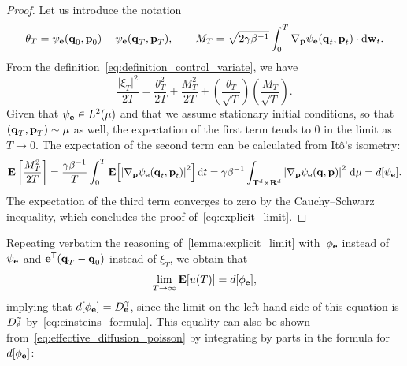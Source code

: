 \documentclass[11pt,a4paper]{article}
\begin{document}
\begin{proof}
    Let us introduce the notation
    \[
        \theta_T = \psi_{\boldsymbol{\mathbf e}}(\boldsymbol{\mathbf q}_0, \boldsymbol{\mathbf p}_0) - \psi_{\boldsymbol{\mathbf e}}(\boldsymbol{\mathbf q}_T, \boldsymbol{\mathbf p}_T),
        \qquad
        M_T = \sqrt{2 \gamma \beta^{-1}} \int_{0}^{T} \nabla_{\boldsymbol{\mathbf p}} \psi_{\boldsymbol{\mathbf e}}(\boldsymbol{\mathbf q}_t, \boldsymbol{\mathbf p}_t) \cdot \mathrm d \boldsymbol{\mathbf w}_t.
    \]
    From the definition~\eqref{eq:definition_control_variate},
    we have
    \[
        \frac{\lvert \xi_T \rvert^2}{2T} = \frac{\theta_T^2}{2T} + \frac{M_T^2}{2T} + \left(\frac{\theta_T}{\sqrt{T}}\right) \left(\frac{M_T}{\sqrt{T}}\right).
    \]
    Given that $\psi_{\boldsymbol{\mathbf e}} \in L^2(\mu)$ and that we assume stationary initial conditions,
    so that $(\boldsymbol{\mathbf q}_T, \boldsymbol{\mathbf p}_T) \sim \mu$ as well,
    the expectation of the first term tends to 0 in the limit as $T \to 0$.
    The expectation of the second term can be calculated from It\^o's isometry:
    \[
        \mathbf{E} \left[ \frac{M_T^2}{2T} \right]
        = \frac{\gamma \beta^{-1}}{T} \int_{0}^{T} \mathbf{E} \Bigl[\left\lvert \nabla_{\boldsymbol{\mathbf p}} \psi_{\boldsymbol{\mathbf e}}(\boldsymbol{\mathbf q}_t, \boldsymbol{\mathbf p}_t) \right\rvert^2\Bigr] \, \mathrm d t
        = \gamma \beta^{-1} \int_{\mathbf T^d \times \mathbf R^d} \left\lvert \nabla_{\boldsymbol{\mathbf p}} \psi_{\boldsymbol{\mathbf e}}(\boldsymbol{\mathbf q}, \boldsymbol{\mathbf p}) \right\rvert^2 \, \mathrm d \mu
        = d[\psi_{\boldsymbol{\mathbf e}}].
    \]
    The expectation of the third term converges to zero by the Cauchy--Schwarz inequality,
    which concludes the proof of~\eqref{eq:explicit_limit}.
\end{proof}
Repeating verbatim the reasoning of~\cref{lemma:explicit_limit} with~$\phi_{\boldsymbol{\mathbf e}}$ instead of $\psi_{\boldsymbol{\mathbf e}}$ and $\boldsymbol{\mathbf e}^\mathsf T (\boldsymbol{\mathbf q}_T - \boldsymbol{\mathbf q}_0)$ instead of $\xi_T$,
we obtain that
\[
    \lim_{T \to \infty} \mathbf{E} [u(T)] = d[\phi_{\boldsymbol{\mathbf e}}],
\]
implying that $d[\phi_{\boldsymbol{\mathbf e}}] = D^{\gamma}_{\boldsymbol{\mathbf e}}$,
since the limit on the left-hand side of this equation is $D^{\gamma}_{\boldsymbol{\mathbf e}}$ by~\eqref{eq:einsteins_formula}.
This equality can also be shown from~\eqref{eq:effective_diffusion_poisson} by integrating by parts in the formula for $d[\phi_{\boldsymbol{\mathbf e}}]$:
\end{document}
